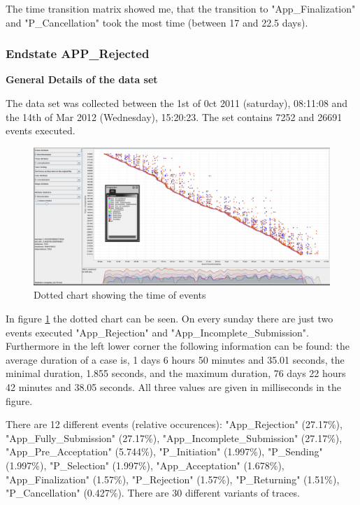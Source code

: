 The time transition matrix showed me, that the transition to "App\_Finalization" and "P\_Cancellation" took the most time (between 17 and 22.5 days).


\subsubsection{Endstate APP\_Rejected}

\textbf{General Details of the data set}

The data set was collected between the 1st of 0ct 2011 (saturday), 08:11:08 and the 14th of Mar 2012 (Wednesday), 15:20:23. The set contains 7252 and 26691 events executed. 

\begin{figure}[!htbp]
\centering
\includegraphics[height = 0.2\textheight]{RejDot.PNG}
\caption{Dotted chart showing the time of events}
\label{fig:RejTimeFlow}
\end{figure}

In figure \ref{fig:RejTimeFlow} the dotted chart can be seen. On every sunday there are just two events executed "App\_Rejection" and "App\_Incomplete\_Submission". Furthermore in the left lower corner the following information can be found: the average duration of a case is, 1 days 6 hours 50 minutes and 35.01 seconds, the minimal duration, 1.855 seconds, and the maximum duration, 76 days 22 hours 42 minutes and 38.05 seconds. All three values are given in milliseconds in the figure.

There are 12 different events (relative occurences):
"App\_Rejection" (27.17\%), "App\_Fully\_Submission" (27.17\%), "App\_Incomplete\_Submission" (27.17\%), "App\_Pre\_Acceptation" (5.744\%), "P\_Initiation" (1.997\%), "P\_Sending" (1.997\%), "P\_Selection" (1.997\%), "App\_Acceptation" (1.678\%), "App\_Finalization" (1.57\%), "P\_Rejection" (1.57\%), "P\_Returning" (1.51\%), "P\_Cancellation" (0.427\%). There are 30 different variants of traces.

